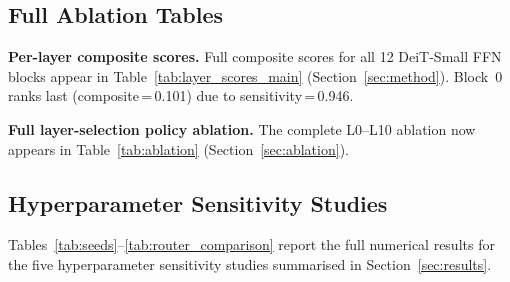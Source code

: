 \subsection{Full Ablation Tables}
\label{app:ablation}

\textbf{Per-layer composite scores.} Full composite scores for all 12 DeiT-Small FFN blocks appear in Table~\ref{tab:layer_scores_main} (Section~\ref{sec:method}). Block~0 ranks last (composite\,=\,0.101) due to sensitivity\,=\,0.946.

\textbf{Full layer-selection policy ablation.} The complete L0--L10 ablation now appears in Table~\ref{tab:ablation} (Section~\ref{sec:ablation}).

\FloatBarrier
\subsection{Hyperparameter Sensitivity Studies}
\label{app:sensitivity}

Tables~\ref{tab:seeds}--\ref{tab:router_comparison} report the full numerical results for the five hyperparameter sensitivity studies summarised in Section~\ref{sec:results}.

\begin{table}[H]
\caption{3-Seed Robustness. Full composite-score pipeline, $E{=}4$, DeiT-Small.}
\label{tab:seeds}
\centering
\small
{}
\end{table}

